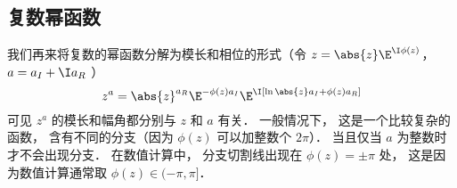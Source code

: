 
\begin{issues}
\issueDraft
\issueTODO
\end{issues}



\subsection{复数幂函数}
我们再来将复数的幂函数分解为模长和相位的形式（令 $z = \abs{z} \E^{\I\phi(z)}$， $a = a_I + \I a_R$ ）
\begin{equation}
z^a = \abs{z}^{a_R} \E^{-\phi(z) a_I} \E^{\I[\ln\abs{z}a_I + \phi(z)a_R]}
\end{equation}
可见 $z^a$ 的模长和幅角都分别与 $z$ 和 $a$ 有关． 一般情况下， 这是一个比较复杂的函数， 含有不同的分支（因为 $\phi(z)$ 可以加整数个 $2\pi$）．%
当且仅当 $a$ 为整数时才不会出现分支． 在数值计算中， 分支切割线出现在 $\phi(z) = \pm\pi$ 处， 这是因为数值计算通常取 $\phi(z)\in(-\pi, \pi]$．
